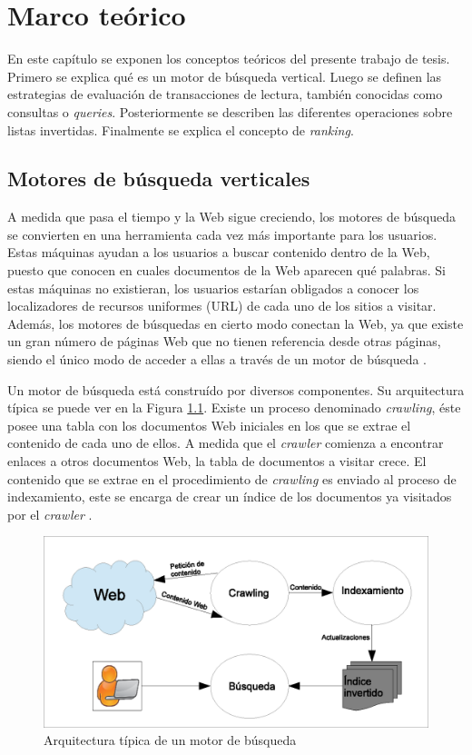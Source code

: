 \chapter{Marco te\'orico}
\label{cap:marco}
En este capítulo se exponen los conceptos teóricos del presente trabajo de tesis. Primero se explica qué es un motor de búsqueda vertical. Luego se definen las estrategias de evaluación de transacciones de lectura, también conocidas como consultas o \textit{queries}. Posteriormente se describen las diferentes operaciones sobre listas invertidas. Finalmente se explica el concepto de \textit{ranking}. 

\section{Motores de búsqueda verticales}
\label{marco:mbv}
A medida que pasa el tiempo y la Web sigue creciendo, los motores de búsqueda se convierten en una herramienta cada vez más importante para los usuarios. Estas máquinas ayudan a los usuarios a buscar contenido dentro de la Web, puesto que conocen en cuales documentos de la Web aparecen qué palabras. Si estas máquinas no existieran, los usuarios estarían obligados a conocer los localizadores de recursos uniformes (URL) de cada uno de los sitios a visitar. Además, los motores de búsquedas en cierto modo conectan la Web, ya que existe un gran número de páginas Web que no tienen referencia desde otras páginas, siendo el único modo de acceder a ellas a través de un motor de búsqueda \citep{Baeza-Yates:2008}.

Un motor de búsqueda está construído por diversos componentes. Su arquitectura típica se puede ver en la Figura \ref{fig:searchenginearchitecture}. Existe un proceso denominado \textit{crawling}, éste posee una tabla con los documentos Web iniciales en los que se extrae el contenido de cada uno de ellos. A medida que el \textit{crawler} comienza a encontrar enlaces a otros documentos Web, la tabla de documentos a visitar crece. El contenido que se extrae en el procedimiento de \textit{crawling} es enviado al proceso de indexamiento, este se encarga de crear un índice de los documentos ya visitados por el \textit{crawler} \citep{Croft:2009}.

\begin{figure}[!th]
\centering
\includegraphics[scale=.75]{images/searchenginearchitecture.eps}
\caption{Arquitectura típica de un motor de búsqueda}
\label{fig:searchenginearchitecture}
\end{figure}

